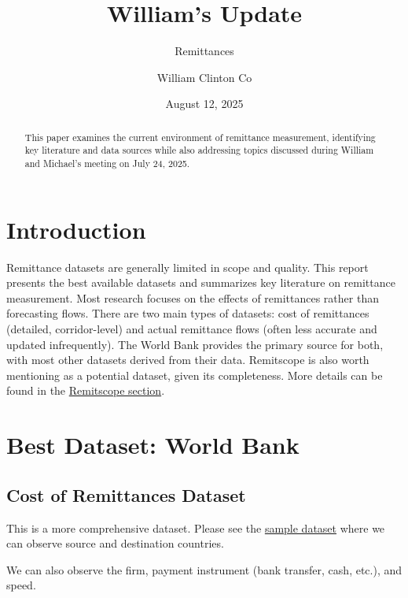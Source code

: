\documentclass[
  11pt,
]{article}
\title{William's Update}
\subtitle{Remittances}
\author{William Clinton Co}
\date{August 12, 2025}
\renewcommand*\contentsname{Table of contents}
\newcommand\contentsname{Table of contents}
\begin{document}
\maketitle
\begin{abstract}
This paper examines the current environment of remittance measurement,
identifying key literature and data sources while also addressing topics
discussed during William and Michael's meeting on July 24, 2025.
\end{abstract}

\renewcommand*\contentsname{Table of contents}
{
\hypersetup{linkcolor=}
\setcounter{tocdepth}{10}
\tableofcontents
}

\section{Introduction}\label{introduction}

Remittance datasets are generally limited in scope and quality. This
report presents the best available datasets and summarizes key
literature on remittance measurement. Most research focuses on the
effects of remittances rather than forecasting flows. There are two main
types of datasets: cost of remittances (detailed, corridor-level) and
actual remittance flows (often less accurate and updated infrequently).
The World Bank provides the primary source for both, with most other
datasets derived from their data. Remitscope is also worth mentioning as
a potential dataset, given its completeness. More details can be found
in the \hyperref[remitscope]{Remitscope section}.

\section{Best Dataset: World Bank}\label{best-dataset-world-bank}

\subsection{Cost of Remittances
Dataset}\label{cost-of-remittances-dataset}

This is a more comprehensive dataset. Please see the
\href{https://github.com/WilliamClintC/RER/blob/main/data/Remittance_2/rpw_dataset_2011_2024_q3.xlsx}{sample
dataset} where we can observe source and destination countries.

We can also observe the firm, payment instrument (bank transfer, cash,
etc.), and speed.
\end{document}
